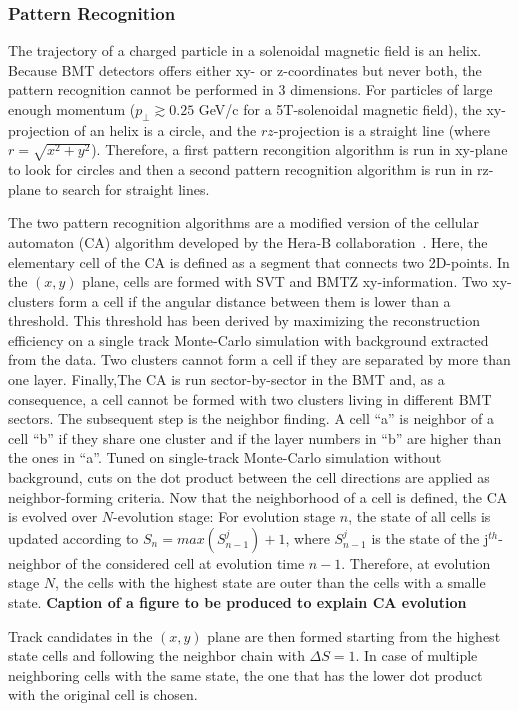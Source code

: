 \documentclass[3p,times,twocolumn]{elsarticle}
\begin{document}
\subsubsection{Pattern Recognition}
The trajectory of a charged particle in a solenoidal magnetic field is an helix. Because BMT detectors offers either
xy- or z-coordinates but never both, the pattern recognition cannot be performed in 3 dimensions. For particles of
large enough momentum ($p_\perp \gtrsim 0.25$ GeV/c for a 5T-solenoidal magnetic field), the xy-projection of an
helix is a circle, and the $rz$-projection is a straight line (where $r = \sqrt{x^2 + y^2}$). Therefore, a first
pattern recongition algorithm is run in xy-plane to look for circles and then a second pattern recognition algorithm is
run in rz-plane to search for straight lines.

The two pattern recognition algorithms are a modified version of the cellular automaton (CA) algorithm developed by the
Hera-B collaboration~\cite{CA-HeraB}. Here, the elementary cell of the CA is defined as a segment that connects two
2D-points.
In the $(x,y)$ plane, cells are formed with SVT and BMTZ xy-information. Two xy-clusters form a cell if the angular
distance between them is lower than a threshold. This threshold has been derived by maximizing the reconstruction
efficiency on a single track Monte-Carlo simulation with background extracted from the data. Two clusters cannot form a
cell if they are separated by more than one layer. Finally,The CA is run sector-by-sector in the BMT and, as a
consequence, a cell cannot be formed with two clusters living in different BMT sectors.
The subsequent step is the neighbor finding. A cell ``a'' is neighbor of a cell ``b'' if they share one cluster and if
the layer numbers in ``b'' are higher than the ones in ``a''. Tuned on single-track Monte-Carlo simulation without
background, cuts on the dot product between the cell directions are applied  as neighbor-forming criteria.
Now that the neighborhood of a cell is defined, the CA is evolved over $N$-evolution stage: For evolution stage $n$,
the state of all cells is updated according to $S_n = max(S_{n-1}^j) + 1$, where $S_{n-1}^j$ is the state of the
j$^{th}$-neighbor of the considered cell at evolution time $n-1$. Therefore, at evolution stage $N$, the cells with the
highest state are outer than the cells with a smalle state.
\color{red} \textbf{Caption of a figure to be produced to explain CA evolution} \color{black}

Track candidates in the $(x,y)$ plane are then formed starting from the highest state cells and following the neighbor
chain with $\Delta S = 1$. In case of multiple neighboring cells with the same state, the one that has the lower dot
product with the original cell is chosen.
\end{document}
